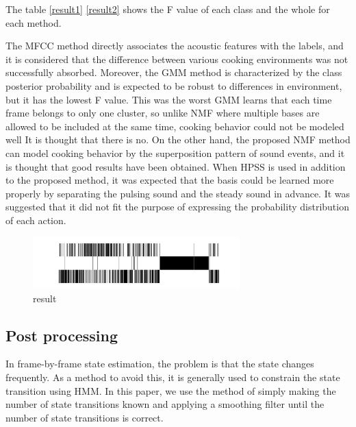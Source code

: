 \documentclass[sigchi]{acmart}
\begin{document}
The table \ref{result1} \ref{result2} shows the F value of each class and the whole for each method.

The MFCC method directly associates the acoustic features with the labels, and it is considered that the difference between various cooking environments was not successfully absorbed.
Moreover, the GMM method is characterized by the class posterior probability and is expected to be robust to differences in environment, but it has the lowest F value. This was the worst%
GMM learns that each time frame belongs to only one cluster, so unlike NMF where multiple bases are allowed to be included at the same time, cooking behavior could not be modeled well It is thought that there is no.
On the other hand, the proposed NMF method can model cooking behavior by the superposition pattern of sound events, and it is thought that good results have been obtained.
When HPSS is used in addition to the proposed method, it was expected that the basis could be learned more properly by separating the pulsing sound and the steady sound in advance. It was suggested that it did not fit the purpose of expressing the probability distribution of each action.

\begin{figure}[h]
  \centering
  \includegraphics[width=8cm]{fig/N63_m4.pdf}
  \caption{result}
  \Description{}
  \label{baseine_timeline_result}
\end{figure}

\subsection{Post processing}

In frame-by-frame state estimation, the problem is that the state changes frequently. As a method to avoid this, it is generally used to constrain the state transition using HMM.
In this paper, we use the method of simply making the number of state transitions known and applying a smoothing filter until the number of state transitions is correct.
\end{document}
